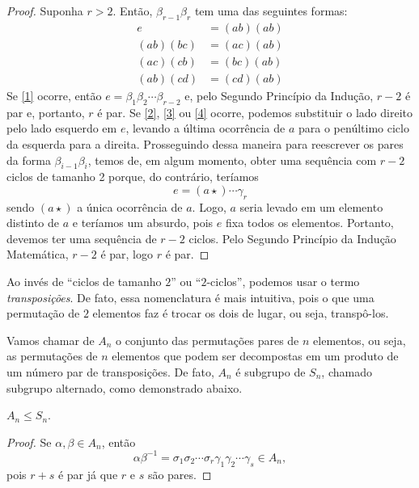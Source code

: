	\begin{proof}
		Suponha $r>2$. Então, $\beta_{r-1}\beta_{r}$ tem uma das
		seguintes formas:
		\begin{align}
		    \label{1} e &= (ab)(ab) \\
		    \label{2} (ab)(bc) &= (ac)(ab) \\
		    \label{3} (ac)(cb) &= (bc)(ab) \\
		    \label{4} (ab)(cd) &= (cd)(ab)
		\end{align}
		Se \eqref{1} ocorre, então 
		$e = \beta_{1}\beta_{2}\cdots\beta_{r-2}$ e, pelo 
		Segundo Princípio da Indução, $r-2$ é par e, portanto, 
		$r$ é par. Se \eqref{2}, \eqref{3} ou \eqref{4} ocorre,
		podemos substituir o lado direito pelo lado esquerdo em
		$e$, levando a última ocorrência de $a$ para o penúltimo
		ciclo da esquerda para a direita. Prosseguindo dessa
		maneira para reescrever os pares da forma
		$\beta_{i-1}\beta_{i}$, temos de, em algum momento, 
		obter uma sequência com $r-2$ ciclos de tamanho 2 
		porque, do contrário, teríamos
		\begin{equation*}
		    e = (a \star)\cdots\gamma_{r}
		\end{equation*}
		sendo $(a\star)$ a única ocorrência de $a$. Logo, 
		$a$ seria levado em um elemento distinto de $a$ e 
		teríamos um absurdo, pois $e$ fixa todos os elementos.
		Portanto, devemos ter uma sequência de $r-2$ ciclos. 
		Pelo Segundo Princípio da Indução Matemática, 
		$r-2$ é par, logo $r$ é par.
	\end{proof}
	\par\vspace{0.3cm} Ao invés de ``ciclos de tamanho $2$'' ou
	``$2$-ciclos'', podemos usar o termo \textit{transposições}. 
	De fato, essa nomenclatura é mais intuitiva, pois o que uma
	permutação de $2$ elementos faz é trocar os dois de lugar, 
	ou seja, transpô-los.
	\par\vspace{0.3cm} Vamos chamar de $A_n$ o conjunto das
	permutações pares de $n$ elementos, ou seja, as permutações 
	de $n$ elementos que podem ser decompostas em um produto 
	de um número par de transposições. De fato, $A_n$ é 
	subgrupo de $S_n$, chamado subgrupo alternado, como demonstrado abaixo.
	\begin{theorem}
	\label{grupo alternante subgrupo de S_n}
		$A_n \leq S_n$.
	\end{theorem}
	\begin{proof}
        Se $\alpha, \beta \in A_n$, então
        \begin{equation*}
        \alpha\beta^{-1}
        = 
        \sigma_1\sigma_2\cdots\sigma_r\gamma_1\gamma_2\cdots\gamma_s \in A_n,
        \end{equation*}
        pois $r+s$ é par já que $r$ e $s$ são pares. 
    \end{proof}
